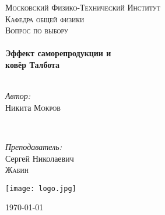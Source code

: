 \documentclass{urticle}
\newenvironment{bottompar}{\par\vspace*{\fill}}{\clearpage}
\begin{document}
\begin{titlepage}

\center %
 

\textsc{\LARGE Московский Физико-Технический Институт}\\[1,5cm] %
\textsc{\Large Кафедра общей физики}\\[0.5cm] %
\textsc{\large Вопрос по выбору}\\[0.5cm] %


\HRule
\\[0.4cm]
{ \huge \bfseries Эффект саморепродукции и \\ ковёр Талбота}
\\[0.2cm] %
\HRule
\\[1.5cm]


 

\begin{minipage}{0.4\textwidth}
	\begin{flushleft} \large
		\emph{Автор:}\\
		Никита \textsc{Мокров} %
	\end{flushleft}
\end{minipage}
~
\begin{minipage}{0.4\textwidth}
	\begin{flushright} \large
		\emph{Преподаватель:} \\
		Сергей Николаевич \\ \textsc{Жабин} %
	\end{flushright}
\end{minipage}

\begin{bottompar}
	\begin{center}
		\texttt{[image: logo.jpg]}
	\end{center}
	{\large \today}

\end{bottompar}
\vfill %

\end{titlepage}
\end{document}
